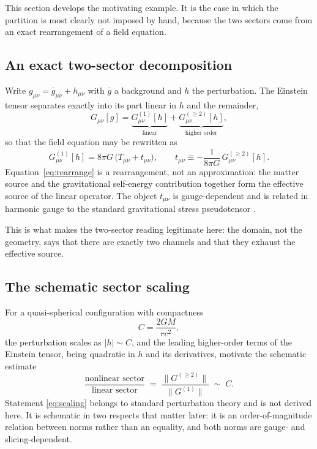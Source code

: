 \documentclass[11pt,a4paper]{article}
\theoremstyle{definition}
\theoremstyle{plain}
\theoremstyle{remark}
\newcommand{\lin}{{(1)}}
\newcommand{\nonlin}{{(\ge 2)}}
\begin{document}
This section develops the motivating example. It is the case in which the
partition is most clearly not imposed by hand, because the two sectors come
from an exact rearrangement of a field equation.

\subsection{An exact two-sector decomposition}

Write $g_{\mu\nu}=\bar g_{\mu\nu}+h_{\mu\nu}$ with $\bar g$ a background and
$h$ the perturbation. The Einstein tensor separates exactly into its part
linear in $h$ and the remainder,
\begin{equation}
G_{\mu\nu}[g]
= \underbrace{G^{\lin}_{\mu\nu}[h]}_{\text{linear}}
+ \underbrace{G^{\nonlin}_{\mu\nu}[h]}_{\text{higher order}} ,
\label{eq:Gsplit}
\end{equation}
so that the field equation may be rewritten as
\begin{equation}
G^{\lin}_{\mu\nu}[h]
= 8\pi G\,\bigl(T_{\mu\nu}+t_{\mu\nu}\bigr),
\qquad
t_{\mu\nu}\equiv -\frac{1}{8\pi G}\,G^{\nonlin}_{\mu\nu}[h] .
\label{eq:rearrange}
\end{equation}
Equation~\eqref{eq:rearrange} is a rearrangement, not an approximation: the
matter source and the gravitational self-energy contribution together form the
effective source of the linear operator. The object $t_{\mu\nu}$ is
gauge-dependent and is related in harmonic gauge to the standard
gravitational stress pseudotensor \cite{LL,ChoquetBruhat}.

This is what makes the two-sector reading legitimate here: the domain, not the
geometry, says that there are exactly two channels and that they exhaust the
effective source.

\subsection{The schematic sector scaling}

For a quasi-spherical configuration with compactness
\begin{equation}
C=\frac{2GM}{rc^{2}} ,
\label{eq:compactness}
\end{equation}
the perturbation scales as $|h|\sim C$, and the leading higher-order terms of
the Einstein tensor, being quadratic in $h$ and its derivatives, motivate the
schematic estimate
\begin{equation}
\frac{\text{nonlinear sector}}{\text{linear sector}}
\;=\;
\frac{\bigl\|G^{\nonlin}\bigr\|}{\bigl\|G^{\lin}\bigr\|}
\;\sim\; C .
\label{eq:scaling}
\end{equation}
Statement \eqref{eq:scaling} belongs to standard perturbation
theory \cite{MTW,ChoquetBruhat} and is not derived here. It is
schematic in two respects that matter later: it is an
order-of-magnitude relation between norms rather than an equality, and both
norms are gauge- and slicing-dependent.
\end{document}
